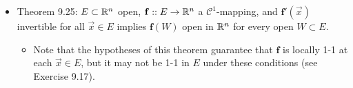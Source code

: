 \documentclass[../notes.tex]{subfiles}
\begin{document}
\begin{itemize}
\begin{enumerate}[label={(\alph*)}]
\begin{proof}
            \begin{equation*}
                \mathbf{g}'(\vec{y}) = [\mathbf{f}'(\mathbf{g}(\vec{y}))]^{-1}
            \end{equation*}
            for all $\vec{y}\in V$, as desired.\par
            To prove that $\mathbf{g}'$ is continuous on $V$, Theorem 4.7 and the above equation tell us that it will suffice to show that $\mathbf{g}:V\to U$ is continuous, $\mathbf{f'}:U\to L(\R^n)$ is continuous, and $M\mapsto M^{-1}:L(\R^n)\to L(\R^n)$ is continuous. But we have the first condition since differentiability implies continuity and $\mathbf{g}$ is differentiable, we have the second condition since $\mathbf{f}\in\mathscr{C}^1$ by hypothesis, and we have the third condition by Theorem 9.8b, as desired.
        \end{proof}
    \end{enumerate}
    \item Theorem 9.25: $E\subset\mathbb{R}^n$ open, $\mathbf{f}::E\to\mathbb{R}^n$ a $\mathscr{C}^1$-mapping, and $\mathbf{f}'(\vec{x})$ invertible for all $\vec{x}\in E$ implies $\mathbf{f}(W)$ open in $\mathbb{R}^n$ for every open $W\subset E$.
    \begin{itemize}
        \item Note that the hypotheses of this theorem guarantee that $\mathbf{f}$ is locally 1-1 at each $\vec{x}\in E$, but it may not be 1-1 in $E$ under these conditions (see Exercise 9.17).
    \end{itemize}
\end{itemize}
\end{document}
